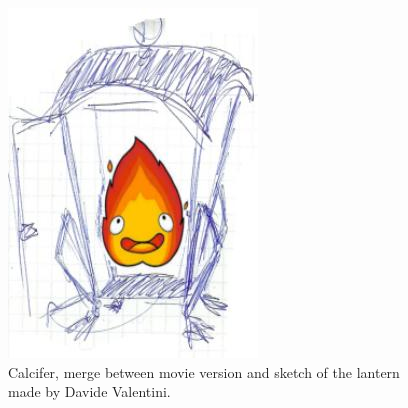 \hfill\begin{minipage}{0.4\textwidth}
  \begin{figure}[H]
    \includegraphics{Images/Characters/lantern}
    \caption{Calcifer, merge between movie version and sketch of the lantern made by Davide Valentini.}
\end{figure}
\end{minipage}

